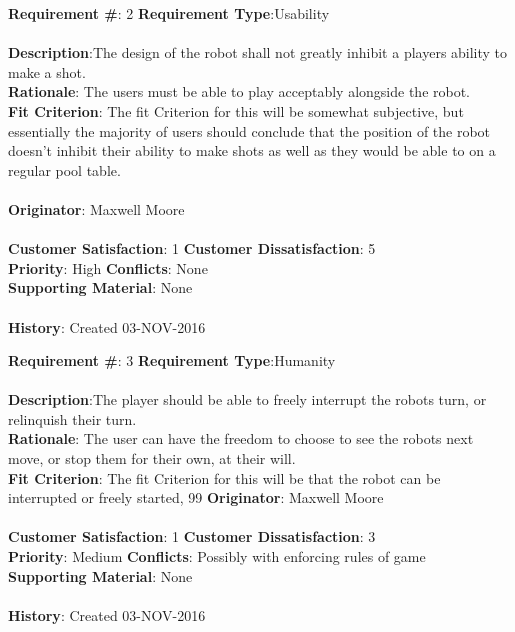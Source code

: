\documentclass[titlepage]{article}
\begin{document}
\begin{framed}
	\noindent\textbf{Requirement \#}: 2 \hfill \textbf{Requirement Type}:Usability \hfill\\\\
	\noindent\textbf{Description}:The design of the robot shall not greatly inhibit a players ability to make a shot.\\
	\textbf{Rationale}: The users must be able to play acceptably alongside the robot.\\
	\textbf{Fit Criterion}: The fit Criterion for this will be somewhat subjective, but essentially the majority of users should conclude that the position of the robot doesn't inhibit their ability to make shots as well as they would be able to on a regular pool table.\\\\
	\textbf{Originator}: Maxwell Moore\\\\
	\noindent\textbf{Customer Satisfaction}: 1 \hfill 	\textbf{Customer Dissatisfaction}: 5 \hfill\\
	\textbf{Priority}: High \hfill \textbf{Conflicts}: None \hfill\\
	\textbf{Supporting Material}: None\\\\
	\noindent\textbf{History}: Created 03-NOV-2016
\end{framed}

\begin{framed}
	\noindent\textbf{Requirement \#}: 3 \hfill \textbf{Requirement Type}:Humanity \hfill\\\\
	\noindent\textbf{Description}:The player should be able to freely interrupt the robots turn, or relinquish their turn.\\
	\textbf{Rationale}: The user can have the freedom to choose to see the robots next move, or stop them for their own, at their will.\\
	\textbf{Fit Criterion}: The fit Criterion for this will be that the robot can be interrupted or freely started, 99%
	\textbf{Originator}: Maxwell Moore\\\\
	\noindent\textbf{Customer Satisfaction}: 1 \hfill 	\textbf{Customer Dissatisfaction}: 3 \hfill\\
	\textbf{Priority}: Medium \hfill \textbf{Conflicts}: Possibly with enforcing rules of game \hfill\\
	\textbf{Supporting Material}: None\\\\
	\noindent\textbf{History}: Created 03-NOV-2016
\end{framed}
\end{document}
